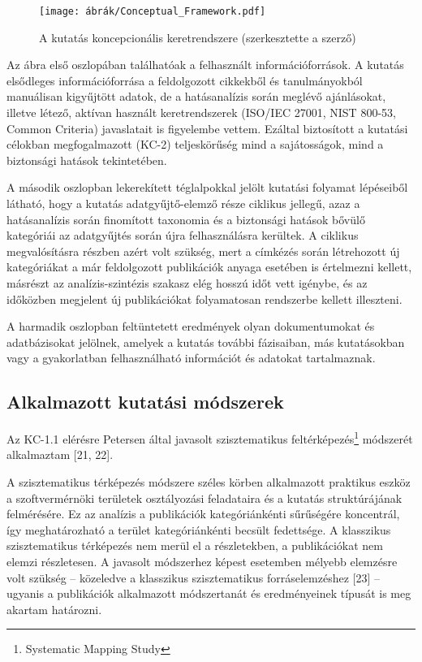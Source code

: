 \documentclass[12pt,magyar,a4paper,oneside]{scrreprt}
\begin{document}
\begin{figure}
\hypertarget{fig:ConFW}{%
\centering
\texttt{[image: ábrák/Conceptual\_Framework.pdf]}
\caption{A kutatás koncepcionális keretrendszere (szerkesztette a
szerző)}\label{fig:ConFW}
}
\end{figure}

Az ábra első oszlopában találhatóak a felhasznált információforrások. A
kutatás elsődleges információforrása a feldolgozott cikkekből és
tanulmányokból manuálisan kigyűjtött adatok, de a hatásanalízis során
meglévő ajánlásokat, illetve létező, aktívan használt keretrendszerek
(ISO/IEC 27001, NIST 800-53, Common Criteria) javaslatait is figyelembe
vettem. Ezáltal biztosított a kutatási célokban megfogalmazott (KC-2)
teljeskörűség mind a sajátosságok, mind a biztonsági hatások
tekintetében.

A második oszlopban lekerekített téglalpokkal jelölt kutatási folyamat
lépéseiből látható, hogy a kutatás adatgyűjtő-elemző része ciklikus
jellegű, azaz a hatásanalízis során finomított taxonomia és a biztonsági
hatások bővülő kategóriái az adatgyűjtés során újra felhasználásra
kerültek. A ciklikus megvalósításra részben azért volt szükség, mert a
címkézés során létrehozott új kategóriákat a már feldolgozott
publikációk anyaga esetében is értelmezni kellett, másrészt az
analízis-szintézis szakasz elég hosszú időt vett igénybe, és az
időközben megjelent új publikációkat folyamatosan rendszerbe kellett
illeszteni.

A harmadik oszlopban feltüntetett eredmények olyan dokumentumokat és
adatbázisokat jelölnek, amelyek a kutatás további fázisaiban, más
kutatásokban vagy a gyakorlatban felhasználható információt és adatokat
tartalmaznak.

\hypertarget{alkalmazott-kutatuxe1si-muxf3dszerek}{%
\subsection{Alkalmazott kutatási
módszerek}\label{alkalmazott-kutatuxe1si-muxf3dszerek}}

Az KC-1.1 elérésre Petersen által javasolt szisztematikus
feltérképezés\footnote{Systematic Mapping Study} módszerét alkalmaztam
{[}21, 22{]}.

A szisztematikus térképezés módszere széles körben alkalmazott praktikus
eszköz a szoftvermérnöki területek osztályozási feladataira és a kutatás
struktúrájának felmérésére. Ez az analízis a publikációk kategóriánkénti
sűrűségére koncentrál, így meghatározható a terület kategóriánkénti
becsült fedettsége. A klasszikus szisztematikus térképezés nem merül el
a részletekben, a publikációkat nem elemzi részletesen. A javasolt
módszerhez képest esetemben mélyebb elemzésre volt szükség -- közeledve
a klasszikus szisztematikus forráselemzéshez {[}23{]} -- ugyanis a
publikációk alkalmazott módszertanát és eredményeinek típusát is meg
akartam határozni.
\end{document}
